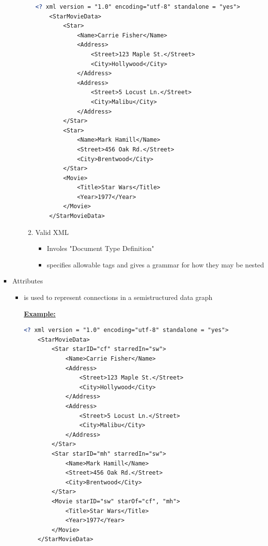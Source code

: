 \documentclass[12pt]{article}
\begin{document}
\begin{enumerate}[1.]
\begin{enumerate}[a)]
\begin{itemize}
\begin{itemize}
\begin{enumerate}[1.]
                \bigskip

    \begin{lstlisting}[language=XML]
    <? xml version = "1.0" encoding="utf-8" standalone = "yes">
    <StarMovieData>
        <Star>
            <Name>Carrie Fisher</Name>
            <Address>
                <Street>123 Maple St.</Street>
                <City>Hollywood</City>
            </Address>
            <Address>
                <Street>5 Locust Ln.</Street>
                <City>Malibu</City>
            </Address>
        </Star>
        <Star>
            <Name>Mark Hamill</Name>
            <Street>456 Oak Rd.</Street>
            <City>Brentwood</City>
        </Star>
        <Movie>
            <Title>Star Wars</Title>
            <Year>1977</Year>
        </Movie>
    </StarMovieData>
    \end{lstlisting}

                \item Valid XML

                \begin{itemize}
                    \item Involes "Document Type Definition"
                    \item specifies allowable tags and gives a grammar for how they may be nested
                \end{itemize}

                \bigskip

            \end{enumerate}
        \end{itemize}

        \item Attributes
        \begin{itemize}
            \item is used to represent connections in a semistructured data graph

            \bigskip

            \underline{\textbf{Example:}}

            \bigskip

    \begin{lstlisting}[language=XML]
    <? xml version = "1.0" encoding="utf-8" standalone = "yes">
    <StarMovieData>
        <Star starID="cf" starredIn="sw">
            <Name>Carrie Fisher</Name>
            <Address>
                <Street>123 Maple St.</Street>
                <City>Hollywood</City>
            </Address>
            <Address>
                <Street>5 Locust Ln.</Street>
                <City>Malibu</City>
            </Address>
        </Star>
        <Star starID="mh" starredIn="sw">
            <Name>Mark Hamill</Name>
            <Street>456 Oak Rd.</Street>
            <City>Brentwood</City>
        </Star>
        <Movie starID="sw" starOf="cf", "mh">
            <Title>Star Wars</Title>
            <Year>1977</Year>
        </Movie>
    </StarMovieData>
    \end{lstlisting}


\end{itemize}
\end{itemize}
\end{enumerate}
\end{enumerate}
\end{document}
